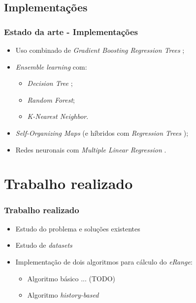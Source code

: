 \documentclass{beamer}
\begin{document}
\subsection[Implementacoes]{Implementações}
\begin{frame}[label={Implementacoes}]
\frametitle{Estado da arte - Implementações}

\let\oldfootnotesize\footnotesize
\renewcommand*{\footnotesize}{\oldfootnotesize\tiny}

\begin{itemize}
	\item Uso combinado de \textit{Gradient Boosting Regression Trees}
		  ;
	\item \textit{Ensemble learning}  com: 
		  \begin{itemize}
			  \item \textit{Decision Tree };
			  \item \textit{Random Forest};
			  \item \textit{K-Nearest Neighbor}.
		  \end{itemize}
	\item \textit{Self-Organizing Maps} 
		  (e híbridos com \textit{Regression Trees} );
	\item Redes neuronais com \textit{Multiple Linear Regression} 
		  .
\end{itemize}

\renewcommand*{\footnotesize}{\oldfootnotesize}

\end{frame}

\section[Trabalho realizado]{Trabalho realizado}
\begin{frame}
\frametitle{Trabalho realizado}

\begin{itemize}
	\item Estudo do problema e soluções existentes
	\item Estudo de \textit{datasets}
	\item Implementação de dois algoritmos para cálculo do \textit{eRange}:
		  \begin{itemize}
			  \item Algoritmo básico ... (TODO) 
			  \item Algoritmo \textit{history-based} 
		  \end{itemize}
\end{itemize}

\end{frame}
\end{document}
